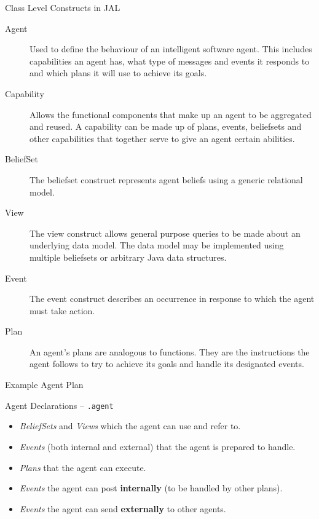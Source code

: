 \documentclass[aspectratio=1610,xcolor=dvipsnames,t]{beamer}
\newcommand{\showcode}[1]{\begin{mdframed}[style=code] %
                          \end{mdframed}%
}
\begin{document}
\begin{frame}{Class Level Constructs in JAL} 
    \begin{description}
        \item[Agent] Used to define the behaviour of an intelligent 
            software agent. This includes capabilities an agent has, 
            what type of messages and events it responds to and which plans it 
            will use to achieve its goals. 
        \item[Capability] Allows the functional components that make up an 
            agent to be aggregated and reused. A capability can be made up of 
            plans, events, beliefsets and other capabilities that together 
            serve to give an agent certain abilities. 
        \item[BeliefSet] The beliefset construct represents agent beliefs 
            using a generic relational model. 
        \item[View] The view construct allows general purpose queries to 
            be made about an underlying data model. 
            The data model may be implemented using multiple beliefsets 
            or arbitrary Java data structures. 
        \item[Event]The event construct describes an occurrence in 
            response to which the agent must take action. 
        \item[Plan] An agent's plans are analogous to functions. 
            They are the instructions the agent follows to try to 
            achieve its goals and handle its designated events. 
    \end{description} 
\end{frame} 

\begin{frame}{Example Agent Plan} 
    \showcode{robotplan.java} 
\end{frame} 

\begin{frame}{Agent Declarations -- \texttt{.agent}} 
    \begin{itemize}
        \item \emph{BeliefSets} and \emph{Views} which the agent can use and refer to. 
        \item \emph{Events} (both internal and external) that the 
               agent is prepared to handle. 
        \item \emph{Plans} that the agent can execute. 
        \item \emph{Events} the agent can post \textbf{internally} 
               (to be handled by other plans). 
        \item \emph{Events} the agent can send \textbf{externally} to other agents. 
    \end{itemize}
\end{frame} 
\end{document}
